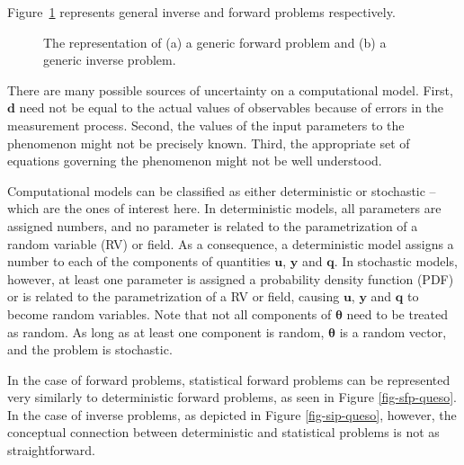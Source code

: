 
Figure~\ref{fig-generic-problems} represents general inverse and forward problems respectively.
\begin{figure}[htbp]
\vspace{-10pt}
\begin{center}
\quad\quad
{}
\end{center}
\vspace{-20pt}
\caption{The representation of (a) a generic forward problem and (b) a generic inverse problem.}
\label{fig-generic-problems}
\end{figure}



There are many possible sources of uncertainty on a computational model. %
First, $\mathbf{d}$ need not be equal to the actual values of observables because of errors in the measurement process. Second, the values of the input parameters to the phenomenon might not be precisely known. Third, the appropriate set of
equations governing the phenomenon might not be well understood. 

Computational models can be classified as either deterministic or stochastic -- which are the ones of interest here.  In deterministic models, all parameters are assigned numbers, and no parameter is related to the parametrization of a random variable (RV) or field. As a
consequence, a deterministic model assigns a number to each of the components of quantities $\mathbf{u}$, $\mathbf{y}$ and $\mathbf{q}$. In stochastic models, however, at least one parameter is assigned a probability density function (PDF) or is related to the parametrization of a RV or field, causing $\mathbf{u}$, $\mathbf{y}$ and $\mathbf{q}$ to become random variables.  Note that not all components of $\boldsymbol{\theta}$ need to be treated as random. As long as at least one component is random, $\boldsymbol{\theta}$ is a random vector, and the problem is stochastic.



In the case of forward problems, statistical forward problems can be represented very similarly to deterministic forward problems,
as seen in Figure \ref{fig-sfp-queso}.
In the case of inverse problems, as depicted in Figure \ref{fig-sip-queso}, however, the conceptual connection between deterministic and statistical problems
is not as straightforward.

